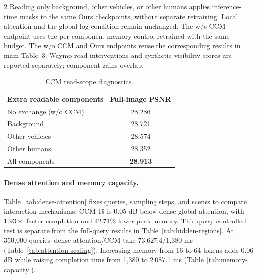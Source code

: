 \begin{multicols}{2}
Reading only background, other vehicles, or other humans applies inference-time masks to the same Ours checkpoints, without separate retraining. Local attention and the global log condition remain unchanged. The w/o CCM endpoint uses the per-component-memory control retrained with the same budget. The w/o CCM and Ours endpoints reuse the corresponding results in main Table~3. Waymo read interventions and synthetic visibility scores are reported separately; component gains overlap.

\begin{table}[H]
\centering\small
\setlength{\tabcolsep}{4pt}
\caption{CCM read-scope diagnostics.}
\label{tab:context-read}
\begin{tabular}{@{}lc@{}}
\toprule
Extra readable components & Full-image PSNR \\
\midrule
No exchange (w/o CCM) & 28.286 \\
Background & 28.721 \\
Other vehicles & 28.574 \\
Other humans & 28.352 \\
All components & \textbf{28.913} \\
\bottomrule
\end{tabular}
\end{table}

\paragraph{Dense attention and memory capacity.}
Table~\ref{tab:dense-attention} fixes queries, sampling steps, and scenes to compare interaction mechanisms. CCM-16 is 0.05 dB below dense global attention, with $1.93\times$ faster completion and 42.71\% lower peak memory. This query-controlled test is separate from the full-query results in Table~\ref{tab:hidden-regions}. At 350,000 queries, dense attention/CCM take 73,627.4/1,380 ms (Table~\ref{tab:attention-scaling}). Increasing memory from 16 to 64 tokens adds 0.06 dB while raising completion time from 1,380 to 2,087.1 ms (Table~\ref{tab:memory-capacity}).


\end{multicols}
